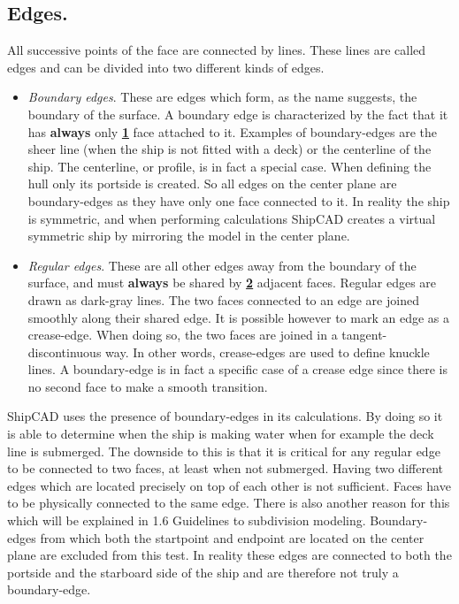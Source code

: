\documentclass[12pt]{article}
\begin{document}
\subsection{Edges.}
All successive points of the face are connected by lines. These lines
are called edges and can be divided into two different kinds of edges.

\begin{itemize}

  \item \textit{Boundary edges}. These are edges which form, as the
  name suggests, the boundary of the surface. A boundary edge is
  characterized by the fact that it has \textbf{always}
  only \underline{\textbf{1}} face attached to it. Examples of
  boundary-edges are the sheer line (when the ship is not fitted with
  a deck) or the centerline of the ship. The centerline, or profile,
  is in fact a special case.  When defining the hull only its portside
  is created. So all edges on the center plane are boundary-edges as
  they have only one face connected to it. In reality the ship is
  symmetric, and when performing calculations ShipCAD creates a
  virtual symmetric ship by mirroring the model in the center plane.

  \item \textit{Regular edges}. These are all other edges away from
  the boundary of the surface, and must \textbf{always} be shared
  by \underline{\textbf{2}} adjacent faces. Regular edges are drawn as
  dark-gray lines. The two faces connected to an edge are joined
  smoothly along their shared edge. It is possible however to mark an
  edge as a crease-edge. When doing so, the two faces are joined in a
  tangent-discontinuous way. In other words, crease-edges are used to
  define knuckle lines. A boundary-edge is in fact a specific case of
  a crease edge since there is no second face to make a smooth
  transition.

\end{itemize}

ShipCAD uses the presence of boundary-edges in its calculations. By
doing so it is able to determine when the ship is making water when
for example the deck line is submerged. The downside to this is that
it is critical for any regular edge to be connected to two faces, at
least when not submerged. Having two different edges which are located
precisely on top of each other is not sufficient. Faces have to be
physically connected to the same edge. There is also another reason
for this which will be explained in 1.6 Guidelines to subdivision
modeling. Boundary-edges from which both the startpoint and endpoint
are located on the center plane are excluded from this test.  In
reality these edges are connected to both the portside and the
starboard side of the ship and are therefore not truly a
boundary-edge.
\end{document}
